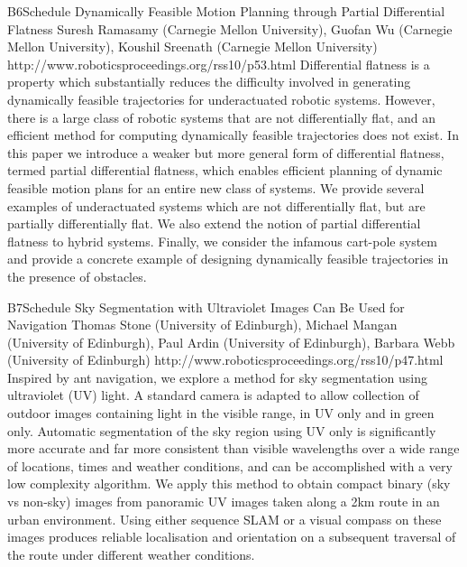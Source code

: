 \begin{spacing}{1.0}
\descriptionPaper
{B6}{Schedule}
{
Dynamically Feasible Motion Planning through Partial Differential Flatness
}
{
Suresh Ramasamy (Carnegie Mellon University), Guofan Wu (Carnegie Mellon University), Koushil Sreenath (Carnegie Mellon University)
}
{
http://www.roboticsproceedings.org/rss10/p53.html
}
{
Differential flatness is a property which substantially reduces the difficulty involved in generating dynamically feasible trajectories for underactuated robotic systems. However, there is a large class of robotic systems that are not differentially flat, and an efficient method for computing dynamically feasible trajectories does not exist. In this paper we introduce a weaker but more general form of differential flatness, termed partial differential flatness, which enables efficient planning of dynamic feasible motion plans for an entire new class of systems. We provide several examples of underactuated systems which are not differentially flat, but are partially differentially flat. We also extend the notion of partial differential flatness to hybrid systems. Finally, we consider the infamous cart-pole system and provide a concrete example of designing dynamically feasible trajectories in the presence of obstacles.
}


\descriptionPaper
{B7}{Schedule}
{
Sky Segmentation with Ultraviolet Images Can Be Used for Navigation
}
{
Thomas Stone (University of Edinburgh), Michael Mangan (University of Edinburgh), Paul Ardin (University of Edinburgh), Barbara Webb (University of Edinburgh)
}
{
http://www.roboticsproceedings.org/rss10/p47.html
}
{
Inspired by ant navigation, we explore a method for sky segmentation using ultraviolet (UV) light. A standard camera is adapted to allow collection of outdoor images containing light in the visible range, in UV only and in green only. Automatic segmentation of the sky region using UV only is significantly more accurate and far more consistent than visible wavelengths over a wide range of locations, times and weather conditions, and can be accomplished with a very low complexity algorithm. We apply this method to obtain compact binary (sky vs non-sky) images from panoramic UV images taken along a 2km route in an urban environment. Using either sequence SLAM or a visual compass on these images produces reliable localisation and orientation on a subsequent traversal of the route under different weather conditions.
}




\end{spacing}
